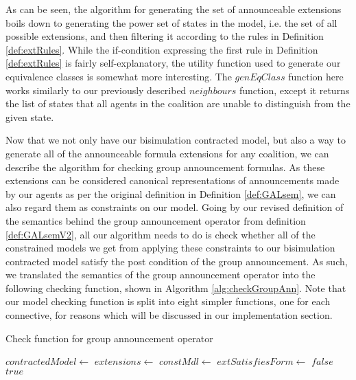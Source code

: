 As can be seen, the algorithm for generating the set of announceable extensions boils down to generating the power set of states in the model, i.e. the set of all possible extensions, and then filtering it according to the rules in Definition \ref{def:extRules}. While the if-condition expressing the first rule in Definition \ref{def:extRules} is fairly self-explanatory, the utility function used to generate our equivalence classes is somewhat more interesting. The $genEqClass$ function here works similarly to our previously described $neighbours$ function, except it returns the list of states that all agents in the coalition are unable to distinguish from the given state. 

Now that we not only have our bisimulation contracted model, but also a way to generate all of the announceable formula extensions for any coalition, we can describe the algorithm for checking group announcement formulas. As these extensions can be considered canonical representations of announcements made by our agents as per the original definition in Definition \ref{def:GALsem}, we can also regard them as constraints on our model. Going by our revised definition of the semantics behind the group announcement operator from definition \ref{def:GALsemV2}, all our algorithm needs to do is check whether all of the constrained models we get from applying these constraints to our bisimulation contracted model satisfy the post condition of the group announcement. As such, we translated the semantics of the group announcement operator into the following checking function, shown in Algorithm \ref{alg:checkGroupAnn}. Note that our model checking function is split into eight simpler functions, one for each connective, for reasons which will be discussed in our implementation section.

\begin{algorithm}
	\caption{Check function for group announcement operator}
	\label{alg:checkGroupAnn}
	\begin{algorithmic}	
		\State $contractedModel \gets$ 
		\State $extensions \gets $
			\State $constMdl \gets$ 
			\State $extSatisfiesForm \gets $ 
				\State \Return $false$
			\EndIf
		\EndFor
		\State \Return $true$
		\EndFunction
	\end{algorithmic}
\end{algorithm}

